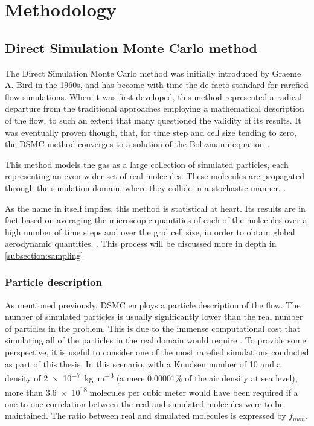 \section{Methodology}
\label{section:3}

\subsection{Direct Simulation Monte Carlo method}
The Direct Simulation Monte Carlo method  was initially introduced by Graeme A. Bird in the 1960s, and has become with time the de facto standard for rarefied flow simulations. When it was first developed, this method represented a radical departure from the traditional approaches employing a mathematical description of the flow, to such an extent that many questioned the validity of its results. It was eventually proven though, that, for time step and cell size tending to zero, the DSMC method converges to a solution of the Boltzmann equation \cite{bird}.

This method models the gas as a large collection of simulated particles, each representing an even wider set of real molecules. These molecules are propagated through the simulation domain, where they collide in a stochastic manner. \cite{themontecarlo}.

As the name in itself implies, this method is statistical at heart. Its results are in fact based on averaging the microscopic quantities of each of the molecules over a high number of time steps and over the grid cell size, in order to obtain global aerodynamic quantities. \cite{bird, themontecarlo}. This process will be discussed more in depth in \autoref{subsection:sampling}

\subsubsection{Particle description}
As mentioned previously, DSMC employs a particle description of the flow. The number of simulated particles is usually significantly lower than the real number of particles in the problem. This is due to the immense computational cost that simulating all of the particles in the real domain would require \cite{natodsmc}. To provide some perspective, it is useful to consider one of the most rarefied simulations conducted as part of this thesis. In this scenario, with a Knudsen number of 10 and a density of \qty{2e-7}{\kg\per\meter^3} (a mere 0.00001\% of the air density at sea level), more than \qty{3.6e18}{} molecules per cubic meter would have been required if a one-to-one correlation between the real and simulated molecules were to be maintained. The ratio between real and simulated molecules is expressed by $f_{num}$.

